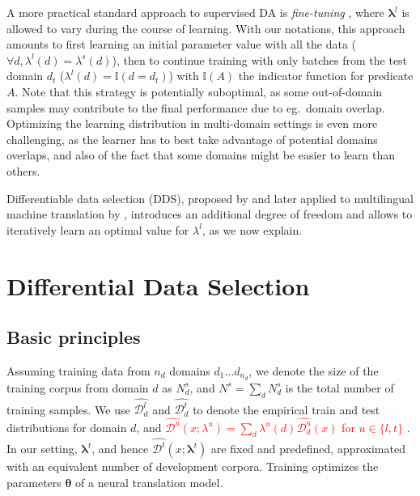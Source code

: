 \documentclass[11pt,a4paper]{article}
\newcommand{\fyTodo}[1]{\Todo[FY:]{\textcolor{orange}{#1}}}
\newcommand{\revision}[1]{\textcolor{red}{#1}}
\newcommand{\vlambda}{\ensuremath{\boldsymbol\lambda}\xspace} %
\newcommand{\vtheta}{\ensuremath{\boldsymbol\theta}\xspace} %
\newcommand{\indic}[1]{\ensuremath{\mathbb{I}(#1)}}
\begin{document}
A more practical standard approach to supervised DA is \emph{fine-tuning} \cite{Luong15stanford,Freitag16fast}, where $\vlambda^{l}$ is allowed to vary during the course of learning. With our notations, this approach amounts to first learning an initial parameter value with all the data ($\forall d, \lambda^{l}(d) = \lambda^{s}(d)$), then to continue training with only batches from the test domain $d_t$ ($\lambda^{l}(d) = \indic{d = d_t}$) with $\indic{A}$ the indicator function for predicate $A$. Note that this strategy is potentially suboptimal, as some out-of-domain samples may contribute to the final performance due to eg.\ domain overlap. Optimizing the learning distribution in multi-domain settings is even more challenging, as the learner has to best take advantage of potential domains overlaps, and also of the fact that some domains might be easier to learn than others.\fyTodo{How to measure this?} 

Differentiable data selection (DDS), proposed by \citet{Wang20optimizing} and later applied to multilingual machine translation by \citet{Wang20balancing}, introduces an additional degree of freedom and allows to iteratively learn an optimal value for $\lambda^{l}$, as we now explain.


\section{Differential Data Selection} \label{sec:dds}
\subsection{Basic principles}
Assuming training data from $n_d$ domains $d_1 \dots d_{n_d}$, we denote the size of the training corpus from domain $d$ as  $N^{s}_d$, and $N^{s} = \sum_d N^{s}_d$ is the total number of training samples. We use $\widehat{\mathcal{D}^l_d}$ and $\widehat{\mathcal{D}^t _d}$ to denote the empirical train and test distributions for domain $d$, and \revision{$\widehat{\mathcal{D}^{u}}(x;\lambda^{u}) = \sum_{d} \lambda^{u}(d) \widehat{\mathcal{D}^{u}_d}(x)$ for $u\in\{l,t\}$} \fyTodo{$\widehat{\mathcal{D}}(x;\lambda) = \sum_{d} \lambda(d) \widehat{\mathcal{D}_d}(x)$}. In our setting,  $\vlambda^t$, and hence $\widehat{\mathcal{D}^t}(x;\vlambda^t)$ are fixed and predefined, approximated with an equivalent number of development corpora. Training optimizes the parameters $\vtheta$ of a neural translation model.
\end{document}
